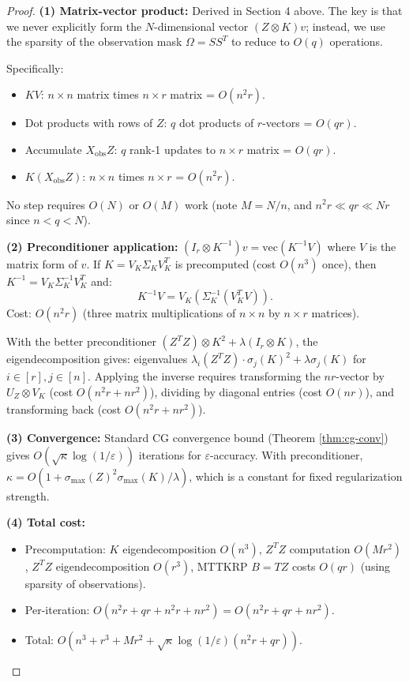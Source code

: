 \documentclass[12pt]{article}
\begin{document}
\begin{proof}
\textbf{(1) Matrix-vector product:} Derived in Section 4 above. The key is that we never explicitly form the $N$-dimensional vector $(Z\otimes K)v$; instead, we use the sparsity of the observation mask $\Omega = SS^T$ to reduce to $O(q)$ operations.

Specifically:
\begin{itemize}
\item $KV$: $n \times n$ matrix times $n \times r$ matrix = $O(n^2 r)$.
\item Dot products with rows of $Z$: $q$ dot products of $r$-vectors = $O(qr)$.
\item Accumulate $X_{\mathrm{obs}}Z$: $q$ rank-1 updates to $n\times r$ matrix = $O(qr)$.
\item $K(X_{\mathrm{obs}}Z)$: $n\times n$ times $n\times r$ = $O(n^2 r)$.
\end{itemize}

No step requires $O(N)$ or $O(M)$ work (note $M = N/n$, and $n^2 r \ll qr \ll Nr$ since $n < q < N$).

\textbf{(2) Preconditioner application:} $(I_r \otimes K^{-1})v = \mathrm{vec}(K^{-1}V)$ where $V$ is the matrix form of $v$. If $K = V_K \Sigma_K V_K^T$ is precomputed (cost $O(n^3)$ once), then $K^{-1} = V_K \Sigma_K^{-1} V_K^T$ and:
\[
K^{-1}V = V_K (\Sigma_K^{-1} (V_K^T V)).
\]
Cost: $O(n^2 r)$ (three matrix multiplications of $n\times n$ by $n\times r$ matrices).

With the better preconditioner $(Z^TZ) \otimes K^2 + \lambda(I_r\otimes K)$, the eigendecomposition gives: eigenvalues $\lambda_i(Z^TZ) \cdot \sigma_j(K)^2 + \lambda \sigma_j(K)$ for $i \in [r], j \in [n]$. Applying the inverse requires transforming the $nr$-vector by $U_Z \otimes V_K$ (cost $O(n^2 r + nr^2)$), dividing by diagonal entries (cost $O(nr)$), and transforming back (cost $O(n^2 r + nr^2)$).

\textbf{(3) Convergence:} Standard CG convergence bound (Theorem \ref{thm:cg-conv}) gives $O(\sqrt{\kappa}\log(1/\varepsilon))$ iterations for $\varepsilon$-accuracy. With preconditioner, $\kappa = O(1 + \sigma_{\max}(Z)^2\sigma_{\max}(K)/\lambda)$, which is a constant for fixed regularization strength.

\textbf{(4) Total cost:}
\begin{itemize}
\item Precomputation: $K$ eigendecomposition $O(n^3)$, $Z^TZ$ computation $O(Mr^2)$, $Z^TZ$ eigendecomposition $O(r^3)$, MTTKRP $B = TZ$ costs $O(qr)$ (using sparsity of observations).
\item Per-iteration: $O(n^2 r + qr + n^2 r + nr^2) = O(n^2 r + qr + nr^2)$.
\item Total: $O(n^3 + r^3 + Mr^2 + \sqrt{\kappa}\log(1/\varepsilon)(n^2 r + qr))$.
\end{itemize}


\end{proof}
\end{document}
